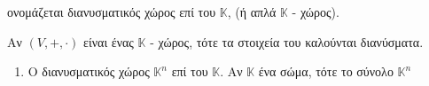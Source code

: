 \begin{dfn}
    ονομάζεται διανυσματικός χώρος επί του $\mathbb{K}$, 
    (ή απλά $ \mathbb{K} $ - χώρος).
\end{dfn}

\begin{dfn}
Αν $ (V,+,\cdot) $ είναι ένας $ \mathbb{K} $ - χώρος, τότε τα στοιχεία του καλούνται 
διανύσματα.
\end{dfn}


\begin{examples}
\item {}
    \begin{enumerate}
        \item Ο διανυσματικός χώρος $ \mathbb{K}^{n} $ επί του $ \mathbb{K} $.
            Αν $ \mathbb{K} $ ένα σώμα, τότε το σύνολο $ \mathbb{K}^{n} $
    \end{enumerate}
\end{examples}


